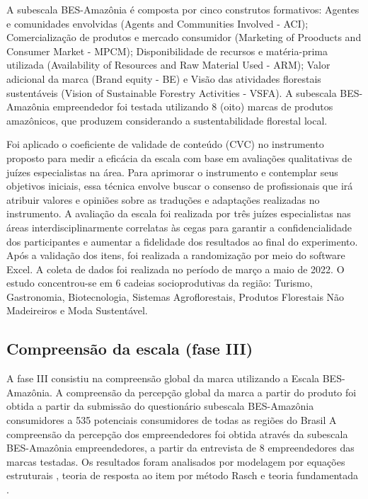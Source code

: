 A subescala BES-Amazônia é composta por cinco construtos formativos: Agentes e comunidades envolvidas (Agents and Communities Involved - ACI); Comercialização de produtos e mercado consumidor (Marketing of Prooducts and Consumer Market - MPCM); Disponibilidade de recursos e matéria-prima utilizada (Availability of Resources and Raw Material Used - ARM); Valor adicional da marca (Brand equity - BE) e Visão das atividades florestais sustentáveis (Vision of Sustainable Forestry Activities - VSFA). A subescala BES-Amazônia empreendedor foi testada utilizando 8 (oito) marcas de produtos amazônicos, que produzem considerando a sustentabilidade florestal local.

Foi aplicado o coeficiente de validade de conteúdo (CVC) no instrumento proposto para medir a eficácia da escala com base em avaliações qualitativas de juízes especialistas na área. Para aprimorar o instrumento e contemplar seus objetivos iniciais, essa técnica envolve buscar o consenso de profissionais que irá atribuir valores e opiniões sobre as traduções e adaptações realizadas no instrumento.
A avaliação da escala foi realizada por três juízes especialistas nas áreas interdisciplinarmente correlatas às cegas para garantir a confidencialidade dos participantes e aumentar a fidelidade dos resultados ao final do experimento. Após a validação dos itens, foi realizada a randomização por meio do software Excel. A coleta de dados foi realizada no período de março a maio de 2022. O estudo concentrou-se em 6 cadeias socioprodutivas da região: Turismo, Gastronomia, Biotecnologia, Sistemas Agroflorestais, Produtos Florestais Não Madeireiros e Moda Sustentável.

\subsection{Compreensão da escala (fase III)}

A fase III consistiu na compreensão global da marca utilizando a Escala BES-Amazônia. A compreensão da percepção global da marca a partir do produto foi obtida a partir da submissão do questionário subescala BES-Amazônia consumidores a 535 potenciais consumidores de todas as regiões do Brasil A compreensão da percepção dos empreendedores foi obtida através da subescala BES-Amazônia empreendedores, a partir da entrevista de 8 empreendedores das marcas testadas. Os resultados foram analisados por modelagem por equações estruturais \cite{West2012ModelModeling}, teoria de resposta ao item por método Rasch \cite{Linacre2012WinstepsGuide} e teoria fundamentada \cite{Glaser2017DiscoveryResearch}.

